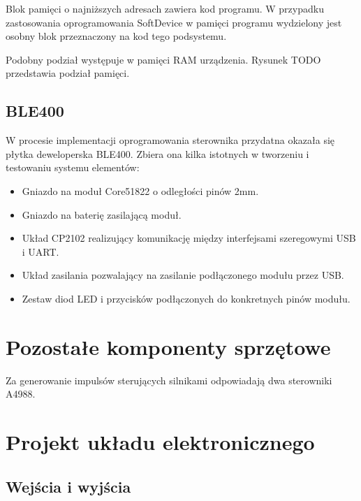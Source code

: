 Blok pamięci o najniższych adresach zawiera kod programu. W przypadku
zastosowania oprogramowania SoftDevice w pamięci programu wydzielony jest osobny
blok przeznaczony na kod tego podsystemu.

Podobny podział występuje w pamięci RAM urządzenia. Rysunek TODO przedstawia
podział pamięci.

\subsection{BLE400}

W procesie implementacji oprogramowania sterownika przydatna okazała się płytka
deweloperska BLE400. Zbiera ona kilka istotnych w tworzeniu i testowaniu systemu
elementów:

\begin{itemize}

\item Gniazdo na moduł Core51822 o odległości pinów 2mm.

\item Gniazdo na baterię zasilającą moduł.

\item Układ CP2102 realizujący komunikację między interfejsami szeregowymi USB
i UART.

\item Układ zasilania pozwalający na zasilanie podłączonego modułu przez USB.

\item Zestaw diod LED i przycisków podłączonych do konkretnych pinów modułu.

\end{itemize}

\section{Pozostałe komponenty sprzętowe}

Za generowanie impulsów sterujących silnikami odpowiadają dwa sterowniki A4988.

\section{Projekt układu elektronicznego}

\subsection{Wejścia i wyjścia}

